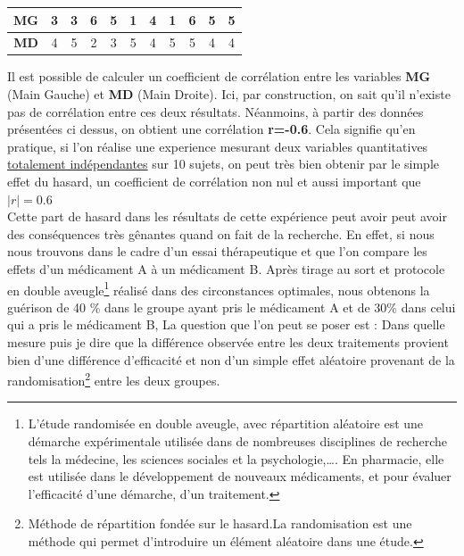 \begin{center}
\begin{tabular}{|c|c|c|c|c|c|c|c|c|c|c|}
\hline
\textbf{MG} & 3 & 3 & 6 & 5 & 1 & 4 & 1 & 6 & 5 & 5 \\ \hline
\textbf{MD} & 4 & 5 & 2 & 3 & 5 & 4 & 5 & 5 & 4 & 4 \\ \hline
\end{tabular}
\end{center}
Il est possible de calculer un coefficient de corrélation entre les variables \textbf{MG} (Main Gauche) et \textbf{MD} (Main Droite). Ici, par construction, on sait qu'il n'existe pas de corrélation entre ces deux résultats.\newline
Néanmoins, à partir des données présentées ci dessus, on obtient une corrélation \textbf{r=-0.6}.\newline
Cela signifie qu'en pratique, si l'on réalise une experience mesurant deux variables quantitatives \underline{totalement indépendantes} sur 10 sujets, on peut très bien obtenir par le simple effet du hasard, un coefficient de corrélation non nul et aussi important que $|r|=0.6$\newline 
\\
Cette part de hasard dans les résultats de cette expérience peut avoir peut avoir des conséquences très gênantes quand on fait de la recherche.\newline
En effet, si nous nous trouvons dans le cadre d'un essai thérapeutique et que l'on compare les effets d'un médicament A à un médicament B. Après tirage au sort et protocole en double aveugle\footnote{L'étude randomisée en double aveugle, avec répartition aléatoire est une démarche expérimentale utilisée dans de nombreuses disciplines de recherche tels la médecine, les sciences sociales et la psychologie,\dots. En pharmacie, elle est utilisée dans le développement de nouveaux médicaments, et pour évaluer l'efficacité d'une démarche, d'un traitement.} réalisé dans des circonstances optimales, nous obtenons la guérison de 40 \% dans le groupe ayant pris le médicament A et de 30\% dans celui qui a pris le médicament B, La question que l'on peut se poser est : Dans quelle mesure puis je dire que la différence observée entre les deux traitements provient bien d'une différence d'efficacité et non d'un simple effet aléatoire provenant de la randomisation\footnote{Méthode de répartition fondée sur le hasard.La randomisation est une méthode qui permet d'introduire un élément aléatoire dans une étude.} entre les deux groupes.\newline
